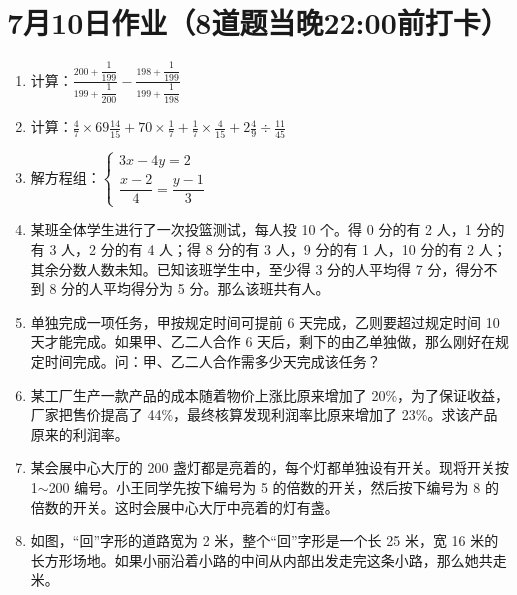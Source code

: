 \documentclass[UTF8,12pt,a4paper]{ctexart}
\newcommand{\BottomWriteSpace}{0.5cm}
\newenvironment{OnePageEightFill}{
  \small
  \vspace*{0pt}
  \begin{enumerate}[leftmargin=*, itemsep=0pt, topsep=0pt, parsep=0pt, partopsep=0pt]
  \setlength{\parskip}{0pt}
}{
  \end{enumerate}
  \vspace*{\BottomWriteSpace}
  \normalsize
  \newpage
}
\newcommand{\Q}[1]{\item #1\par\vfill}
\newcommand{\Qlast}[1]{\item #1\par}
\begin{document}
\section*{7月10日作业（8道题当晚22:00前打卡）}
\begin{OnePageEightFill}

\Q{计算：$\displaystyle \frac{200 + \dfrac{1}{199}}{199 + \dfrac{1}{200}} - \frac{198 + \dfrac{1}{199}}{199 + \dfrac{1}{198}}$}

\Q{计算：$\displaystyle \frac{4}{7} \times 69\frac{14}{15} + 70 \times \frac{1}{7} + \frac{1}{7} \times \frac{4}{15} + 2\frac{4}{9} \div \frac{11}{45}$}

\Q{解方程组：$\begin{cases} 3x - 4y = 2 \\ \dfrac{x-2}{4} = \dfrac{y-1}{3} \end{cases}$}

\Q{某班全体学生进行了一次投篮测试，每人投 10 个。得 0 分的有 2 人，1 分的有 3 人，2 分的有 4 人；得 8 分的有 3 人，9 分的有 1 人，10 分的有 2 人；其余分数人数未知。已知该班学生中，至少得 3 分的人平均得 7 分，得分不到 8 分的人平均得分为 5 分。那么该班共有\underline{\hspace{3em}}人。}

\Q{单独完成一项任务，甲按规定时间可提前 6 天完成，乙则要超过规定时间 10 天才能完成。如果甲、乙二人合作 6 天后，剩下的由乙单独做，那么刚好在规定时间完成。问：甲、乙二人合作需多少天完成该任务？}

\Q{某工厂生产一款产品的成本随着物价上涨比原来增加了 20\%，为了保证收益，厂家把售价提高了 44\%，最终核算发现利润率比原来增加了 23\%。求该产品原来的利润率。}

\Q{某会展中心大厅的 200 盏灯都是亮着的，每个灯都单独设有开关。现将开关按 1$\sim$200 编号。小王同学先按下编号为 5 的倍数的开关，然后按下编号为 8 的倍数的开关。这时会展中心大厅中亮着的灯有\underline{\hspace{3em}}盏。}

\Qlast{如图，“回”字形的道路宽为 2 米，整个“回”字形是一个长 25 米，宽 16 米的长方形场地。如果小丽沿着小路的中间从内部出发走完这条小路，那么她共走\underline{\hspace{3em}}米。}

\end{OnePageEightFill}

\end{document}
